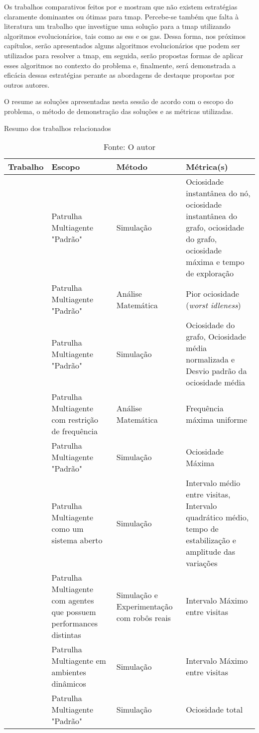 Os trabalhos comparativos feitos por \citep{Almeida:2004:AAI} e 
\citep{sampaiophd} mostram que não existem estratégias claramente dominantes 
ou ótimas para \ac{tmap}. Percebe-se também que falta à literatura um trabalho 
que investigue uma solução para a \ac{tmap} utilizando algoritmos 
evolucionários, tais como as \acp{es} e os \acp{ga}. Dessa forma, nos próximos 
capítulos, serão apresentados alguns algoritmos evolucionários que podem ser 
utilizados para resolver a \ac{tmap}, em seguida, serão propostas formas de 
aplicar esses algoritmos no contexto do problema e, finalmente, será 
demonstrada a eficácia dessas estratégias perante as abordagens de destaque 
propostas por outros autores.

O  resume as soluções apresentadas nesta sessão de 
acordo com o escopo do problema, o método de demonstração das soluções e as 
métricas utilizadas.

\begin{table}[tp]
	\centering
	\caption{Resumo dos trabalhos relacionados}
	\label{tbl:comp_background}
	\begin{tabularx}{\linewidth}{|X|X|X|X|}
		\hline
		\textbf{Trabalho} & \textbf{Escopo} & \textbf{Método} & \textbf{Métrica(s)} \\
		\hline
		\citep{Machado:2002:MPE:1765317.1765332} & Patrulha Multiagente "Padrão" & Simulação & Ociosidade instantânea do nó, ociosidade instantânea do grafo, ociosidade do grafo, ociosidade máxima e tempo de exploração \\
		\hline
		\citep{Chevaleyre:2004:TAM:1018411.1019013} & Patrulha Multiagente "Padrão" & Análise Matemática & Pior ociosidade (\textit{worst idleness}) \\
		\hline
		\citep{Almeida:2004:AAI} & Patrulha Multiagente "Padrão" & Simulação & Ociosidade do grafo, Ociosidade média normalizada e Desvio padrão da ociosidade média \\
		\hline
		\citep{4209122} & Patrulha Multiagente com restrição de frequência & Análise Matemática & Frequência máxima uniforme \\
		\hline
		\citep{4630897} & Patrulha Multiagente "Padrão" & Simulação & Ociosidade Máxima \\
		\hline
		\citep{6495145} & Patrulha Multiagente como um sistema aberto & Simulação & Intervalo médio entre visitas, Intervalo quadrático médio, tempo de estabilização e amplitude das variações \\
		\hline
		\citep{Pippin:2013:PBT:2480362.2480378} & Patrulha Multiagente com agentes que possuem performances distintas & Simulação e Experimentação com robôs reais & Intervalo Máximo entre visitas \\
		\hline
		\citep{6615158} & Patrulha Multiagente em ambientes dinâmicos & Simulação & Intervalo Máximo entre visitas \\
		\hline
		\citep{hernandez2013game} & Patrulha Multiagente "Padrão" & Simulação & Ociosidade total \\
		\hline
	\end{tabularx}
	\caption*{Fonte: O autor}
\end{table}